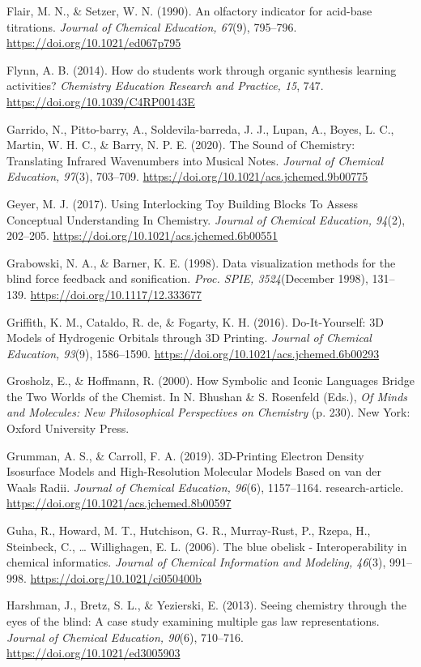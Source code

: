 \documentclass[11.5pt]{sig-alternate} %
\begin{document}
Flair, M. N., \& Setzer, W. N. (1990). An olfactory indicator for acid-base titrations. \textit{Journal of Chemical Education, 67}(9), 795–796. \url{https://doi.org/10.1021/ed067p795}

Flynn, A. B. (2014). How do students work through organic synthesis learning activities? \textit{Chemistry Education Research and Practice, 15}, 747. \url{https://doi.org/10.1039/C4RP00143E}

Garrido, N., Pitto-barry, A., Soldevila-barreda, J. J., Lupan, A., Boyes, L. C., Martin, W. H. C., \& Barry, N. P. E. (2020). The Sound of Chemistry: Translating Infrared Wavenumbers into Musical Notes. \textit{Journal of Chemical Education, 97}(3), 703–709. \url{https://doi.org/10.1021/acs.jchemed.9b00775}

Geyer, M. J. (2017). Using Interlocking Toy Building Blocks To Assess Conceptual Understanding In Chemistry. \textit{Journal of Chemical Education, 94}(2), 202–205. \url{https://doi.org/10.1021/acs.jchemed.6b00551}

Grabowski, N. A., \& Barner, K. E. (1998). Data visualization methods for the blind force feedback and sonification. \textit{Proc. SPIE, 3524}(December 1998), 131–139. \url{https://doi.org/10.1117/12.333677}

Griffith, K. M., Cataldo, R. de, \& Fogarty, K. H. (2016). Do-It-Yourself: 3D Models of Hydrogenic Orbitals through 3D Printing. \textit{Journal of Chemical Education, 93}(9), 1586–1590. \url{https://doi.org/10.1021/acs.jchemed.6b00293}

Grosholz, E., \& Hoffmann, R. (2000). How Symbolic and Iconic Languages Bridge the Two Worlds of the Chemist. In N. Bhushan \& S. Rosenfeld (Eds.), \textit{Of Minds and Molecules: New Philosophical Perspectives on Chemistry} (p. 230). New York: Oxford University Press.

Grumman, A. S., \& Carroll, F. A. (2019). 3D-Printing Electron Density Isosurface Models and High-Resolution Molecular Models Based on van der Waals Radii. \textit{Journal of Chemical Education, 96}(6), 1157–1164. research-article. \url{https://doi.org/10.1021/acs.jchemed.8b00597}

Guha, R., Howard, M. T., Hutchison, G. R., Murray-Rust, P., Rzepa, H., Steinbeck, C., … Willighagen, E. L. (2006). The blue obelisk - Interoperability in chemical informatics. \textit{Journal of Chemical Information and Modeling, 46}(3), 991–998. \url{https://doi.org/10.1021/ci050400b}

Harshman, J., Bretz, S. L., \& Yezierski, E. (2013). Seeing chemistry through the eyes of the blind: A case study examining multiple gas law representations. \textit{Journal of Chemical Education, 90}(6), 710–716. \url{https://doi.org/10.1021/ed3005903}
\end{document}

